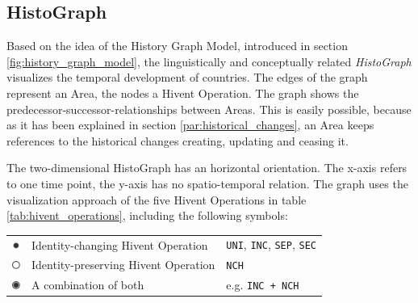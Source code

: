 
\subsection{HistoGraph} %
\label{sub:histograph}

Based on the idea of the History Graph Model, introduced in section \ref{fig:history_graph_model}, the linguistically and conceptually related \emph{HistoGraph} visualizes the temporal development of countries. The edges of the graph represent an Area, the nodes a Hivent Operation. The graph shows the predecessor-successor-relationships between Areas. This is easily possible, because as it has been explained in section \ref{par:historical_changes}, an Area keeps references to the historical changes creating, updating and ceasing it.

The two-dimensional HistoGraph has an horizontal orientation. The x-axis refers to one time point, the y-axis has no spatio-temporal relation. The graph uses the visualization approach of the five Hivent Operations in table \ref{tab:hivent_operations}, including the following symbols:

\begin{table}[H]
\begin{center}
\begin{tabular}{c l l}

  \raisebox{3.5\height}

  \raisebox{-0.2\height}
  {\includegraphics[width=10px]{graphics/development/hivent_model/histograph/circle_filled}}
  & Identity-changing Hivent Operation
  & \texttt{UNI}, \texttt{INC}, \texttt{SEP}, \texttt{SEC} \\

  \raisebox{-0.2\height}
  {\includegraphics[width=10px]{graphics/development/hivent_model/histograph/circle_unfilled}}
  & Identity-preserving Hivent Operation
  & \texttt{NCH} \\

  \raisebox{-0.2\height}
  {\includegraphics[width=10px]{graphics/development/hivent_model/histograph/circle_combo}}
  & A combination of both
  & e.g. \texttt{INC + NCH}

\end{tabular}
\label{tab:histograph_symbols}
\end{center}
\end{table}

